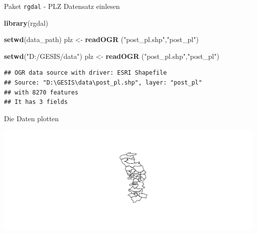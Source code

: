 \documentclass[ignorenonframetext,]{beamer}
\newenvironment{Shaded}{\begin{snugshade}}{\end{snugshade}}
\newcommand{\DecValTok}[1]{\textcolor[rgb]{0.27,0.67,0.26}{#1}}
\newcommand{\KeywordTok}[1]{\textcolor[rgb]{0.26,0.66,0.93}{\textbf{#1}}}
\newcommand{\NormalTok}[1]{\textcolor[rgb]{0.74,0.68,0.62}{#1}}
\newcommand{\OperatorTok}[1]{\textcolor[rgb]{0.74,0.68,0.62}{#1}}
\newcommand{\StringTok}[1]{\textcolor[rgb]{0.02,0.61,0.04}{#1}}
\begin{document}
\begin{frame}[fragile]{Paket \texttt{rgdal} - PLZ Datensatz einlesen}
\protect\hypertarget{paket-rgdal---plz-datensatz-einlesen}{}

\begin{Shaded}
\begin{Highlighting}[]
\KeywordTok{library}\NormalTok{(rgdal)}
\end{Highlighting}
\end{Shaded}

\begin{Shaded}
\begin{Highlighting}[]
\KeywordTok{setwd}\NormalTok{(data_path)}
\NormalTok{plz <-}\StringTok{ }\KeywordTok{readOGR}\NormalTok{ (}\StringTok{"post_pl.shp"}\NormalTok{,}\StringTok{"post_pl"}\NormalTok{)}
\end{Highlighting}
\end{Shaded}

\begin{Shaded}
\begin{Highlighting}[]
\KeywordTok{setwd}\NormalTok{(}\StringTok{"D:/GESIS/data"}\NormalTok{)}
\NormalTok{plz <-}\StringTok{ }\KeywordTok{readOGR}\NormalTok{ (}\StringTok{"post_pl.shp"}\NormalTok{,}\StringTok{"post_pl"}\NormalTok{)}
\end{Highlighting}
\end{Shaded}

\begin{verbatim}
## OGR data source with driver: ESRI Shapefile 
## Source: "D:\GESIS\data\post_pl.shp", layer: "post_pl"
## with 8270 features
## It has 3 fields
\end{verbatim}

\end{frame}

\begin{frame}[fragile]{Die Daten plotten}
\protect\hypertarget{die-daten-plotten}{}

\begin{Shaded}
\end{Shaded}

\includegraphics{Geomedizin_files/figure-beamer/unnamed-chunk-117-1.pdf}

\end{frame}
\end{document}
